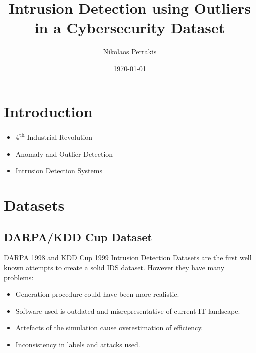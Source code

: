 \documentclass{beamer}
\title{Intrusion Detection using Outliers in a Cybersecurity Dataset}
\author{Nikolaos Perrakis}
\date{\today}
\begin{document}
\frame{\titlepage}

\section[Outline]{}
\frame{
\footnotesize{\tableofcontents}
}

\section{Introduction}
\frame
{

  \begin{itemize}
  \item 4\textsuperscript{th} Industrial Revolution
  \item Anomaly and Outlier Detection
  \item Intrusion Detection Systems
  \end{itemize}
}

\section{Datasets}
\subsection{DARPA/KDD Cup Dataset}
\frame
{
DARPA 1998 and KDD Cup 1999 Intrusion Detection Datasets are the first well known attempts to create a solid IDS dataset. However they have many problems\cite{ids3}:
\begin{itemize}
\item Generation procedure could have been more realistic.
\item Software used is outdated and misrepresentative of current IT landscape.
\item Artefacts of the simulation cause overestimation of efficiency.
\item Inconsistency in labels and attacks used.
\end{itemize}
}
\end{document}
